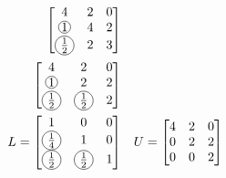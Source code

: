 \documentclass{article}
\newcommand*\circled[1]{\tikz[baseline=(char.base)]{
    \node[shape=circle,draw,inner sep=0.5pt] (char) {#1};}}
\begin{document}
\begin{align}
    \begin{bmatrix}
        4 & 2 & 0 \\
        \circled{\(1\)} & 4 & 2 \\
        \circled{\(\frac{1}{2}\)} & 2 & 3
    \end{bmatrix} \\
    \begin{bmatrix}
        4 & 2 & 0 \\
        \circled{\(1\)} & 2 & 2 \\
        \circled{\(\frac{1}{2}\)} & \circled{\(\frac{1}{2}\)} & 2
    \end{bmatrix} \\
    L = \begin{bmatrix}
        1 & 0 & 0 \\
        \circled{\(\frac{1}{4}\)} & 1 & 0 \\
        \circled{\(\frac{1}{2}\)} & \circled{\(\frac{1}{2}\)} & 1
    \end{bmatrix} & \quad
    U = \begin{bmatrix}
        4 & 2 & 0 \\
        0 & 2 & 2 \\
        0 & 0 & 2
    \end{bmatrix}
\end{align}
\end{document}
